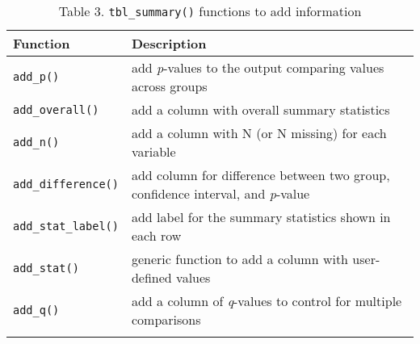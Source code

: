 \captionsetup[table]{labelformat=empty,skip=1pt}
\begin{longtable}{ll}
\toprule
Function & Description \\ 
\midrule
\texttt{add\_p()} & add \emph{p}-values to the output comparing values across groups \\ 
\texttt{add\_overall()} & add a column with overall summary statistics \\ 
\texttt{add\_n()} & add a column with N (or N missing) for each variable \\ 
\texttt{add\_difference()} & add column for difference between two group, confidence interval, and \emph{p}-value \\ 
\texttt{add\_stat\_label()} & add label for the summary statistics shown in each row \\ 
\texttt{add\_stat()} & generic function to add a column with user-defined values \\ 
\texttt{add\_q()} & add a column of \emph{q}-values to control for multiple comparisons \\ 
\bottomrule\caption{\label{tab:caption}Table 3. \texttt{tbl\_summary()} functions to add information}\\

\end{longtable}

